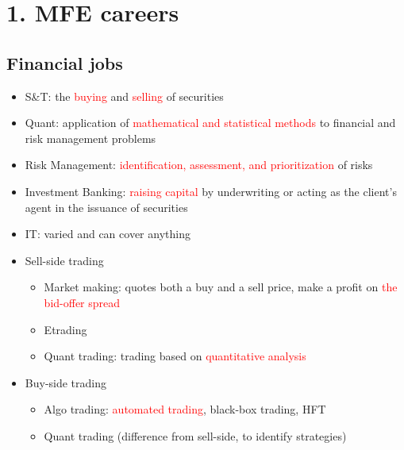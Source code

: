\documentclass[
paper=128mm:96mm, %
fontsize=11pt, %
pagesize, %
parskip=half-, %
]{scrartcl} %
\theoremstyle{mythmstyle} %
\begin{document}
\section{1. MFE careers}

\clearpage


\subsection{Financial jobs}

\begin{itemize}
	\item S\&T: the \textcolor{red}{buying} and \textcolor{red}{selling} of securities
	\item Quant: application of \textcolor{red}{mathematical and statistical methods} to financial and risk management problems
	\item Risk Management: \textcolor{red}{identification, assessment, and prioritization} of risks
	\item Investment Banking: \textcolor{red}{raising capital} by underwriting or acting as the client's agent in the issuance of securities
	\item IT: varied and can cover anything
\end{itemize}

\clearpage


\begin{itemize}
\item Sell-side trading
	\begin{itemize}
		\item Market making: quotes both a buy and a sell price, make a profit on \textcolor{red}{the bid-offer spread}
		\item Etrading
		\item Quant trading: trading based on \textcolor{red}{quantitative analysis}
	\end{itemize}
\item Buy-side trading
	\begin{itemize}
		\item Algo trading: \textcolor{red}{automated trading}, black-box trading, HFT
		\item Quant trading (difference from sell-side, to identify strategies)
	\end{itemize}
\end{itemize}
\end{document}
